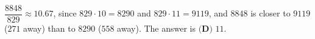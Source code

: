 $\dfrac{8848}{829}\approx10.67$, since $829\cdot10=8290$ and $829\cdot11=9119$, and $8848$ is closer to $9119$ ($271$ away) than to $8290$ ($558$ away). The answer is $\boxed{\textbf{(D) }11}$.
